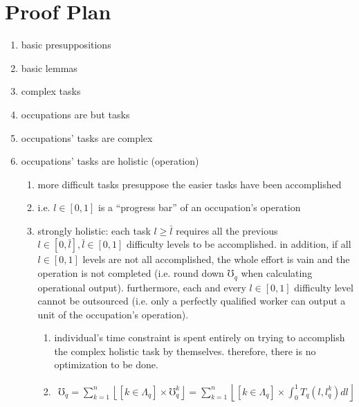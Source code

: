 \documentclass[hidelinks, nonatbib]{elsarticle}
\begin{document}
\section{Proof Plan}
\begin{enumerate}
    \item basic presuppositions
    \item basic lemmas
    \item complex tasks
    \item occupations are but tasks
    \item occupations' tasks are complex
    \item occupations' tasks are holistic (operation)
    \begin{enumerate}
        \item more difficult tasks presuppose the easier tasks have been accomplished
        \item i.e. $l \in [0,1]$ is a ``progress bar'' of an occupation's operation
        \item strongly holistic: each task $l \geq \bar{l}$ requires all the previous $l \in [0, \bar{l}], \bar{l} \in [0,1]$ difficulty levels to be accomplished. in addition, if all $l \in [0,1]$ levels are not all accomplished, the whole effort is vain and the operation is not completed (i.e. round down $\mho_q$ when calculating operational output). furthermore, each and every $l \in [0,1]$ difficulty level cannot be outsourced (i.e. only a perfectly qualified worker can output a unit of the occupation's operation).
        \begin{enumerate}
            \item individual's time constraint is spent entirely on trying to accomplish the complex holistic task by themselves. therefore, there is no optimization to be done.
            \item 
            \begin{align*}
                \mho_q 
                = 
                \sum_{k=1}^{n}{
                    \left\lfloor
                        [k \in \Lambda_q]
                        \times
                        \mho_{q}^{k}
                    \right\rfloor
                }
                = 
                \sum_{k=1}^{n}{
                    \left\lfloor
                        [k \in \Lambda_q]
                        \times
                        \int_{0}^{1}{
                            T_{q}(l,l_{q}^{k})
                            dl
                        }
                    \right\rfloor
                }
            \end{align*}

\end{enumerate}
\end{enumerate}
\end{enumerate}
\end{document}
